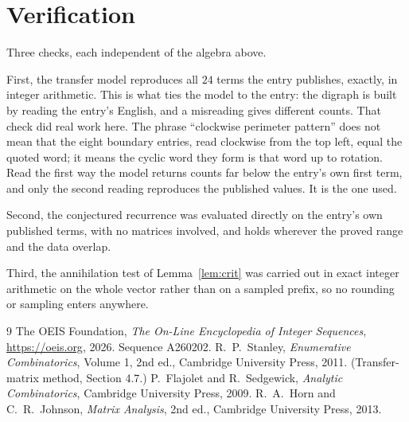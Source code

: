\documentclass[11pt,a4paper]{article}
\theoremstyle{plain}
\theoremstyle{definition}
\begin{document}
\section{Verification}

Three checks, each independent of the algebra above.

First, the transfer model reproduces all $24$ terms the entry publishes, exactly, in
integer arithmetic. This is what ties the model to the entry: the digraph is built by reading
the entry's English, and a misreading gives different counts. That check did real work here. The phrase ``clockwise perimeter pattern'' does not mean that the eight boundary entries, read clockwise from the top left, equal the quoted word; it means the cyclic word they form is that word up to rotation. Read the first way the model returns counts far below the entry's own first term, and only the second reading reproduces the published values. It is the one used.

Second, the conjectured recurrence was evaluated directly on the entry's own published terms,
with no matrices involved, and holds wherever the proved range and the data overlap.

Third, the annihilation test of Lemma~\ref{lem:crit} was carried out in exact integer
arithmetic on the whole vector rather than on a sampled prefix, so no rounding or sampling
enters anywhere.

\begin{thebibliography}{9}
 The OEIS Foundation, \emph{The On-Line Encyclopedia of Integer
Sequences}, \url{https://oeis.org}, 2026. Sequence A260202.
 R.~P.~Stanley, \emph{Enumerative Combinatorics}, Volume 1, 2nd ed.,
Cambridge University Press, 2011. (Transfer-matrix method, Section 4.7.)
 P.~Flajolet and R.~Sedgewick, \emph{Analytic Combinatorics}, Cambridge
University Press, 2009.
 R.~A.~Horn and C.~R.~Johnson, \emph{Matrix Analysis}, 2nd ed., Cambridge
University Press, 2013.
\end{thebibliography}
\end{document}
